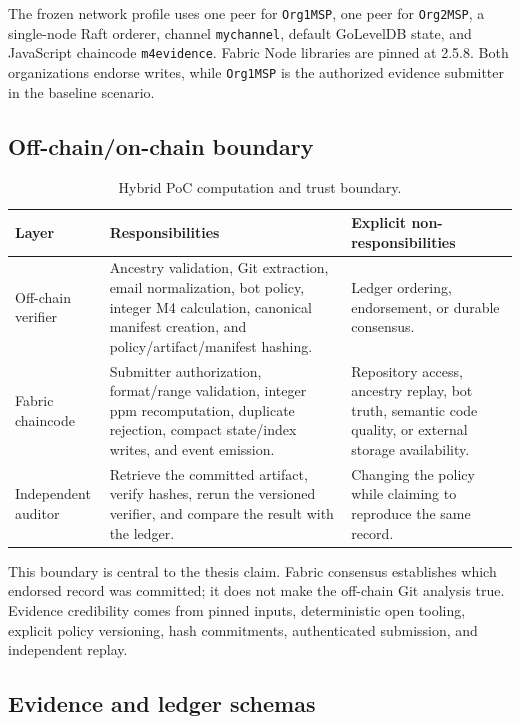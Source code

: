 The frozen network profile uses one peer for \texttt{Org1MSP}, one peer for \texttt{Org2MSP}, a single-node Raft orderer,
channel \texttt{mychannel}, default GoLevelDB state, and JavaScript chaincode \texttt{m4evidence}. Fabric Node libraries are
pinned at 2.5.8. Both organizations endorse writes, while \texttt{Org1MSP} is the authorized evidence submitter in the
baseline scenario.

\subsection{Off-chain/on-chain boundary}
\label{sec:phase3_hybrid_boundary}

\begin{table}[H]
\centering
\small
\renewcommand{\arraystretch}{1.1}
\begin{tabularx}{\textwidth}{p{2.7cm}X X}
\toprule
\textbf{Layer} & \textbf{Responsibilities} & \textbf{Explicit non-responsibilities} \\
\midrule
Off-chain verifier &
Ancestry validation, Git extraction, email normalization, bot policy, integer M4 calculation, canonical manifest creation,
and policy/artifact/manifest hashing. &
Ledger ordering, endorsement, or durable consensus. \\
Fabric chaincode &
Submitter authorization, format/range validation, integer ppm recomputation, duplicate rejection, compact state/index writes,
and event emission. &
Repository access, ancestry replay, bot truth, semantic code quality, or external storage availability. \\
Independent auditor &
Retrieve the committed artifact, verify hashes, rerun the versioned verifier, and compare the result with the ledger. &
Changing the policy while claiming to reproduce the same record. \\
\bottomrule
\end{tabularx}
\caption{Hybrid PoC computation and trust boundary.}
\label{tab:phase3_hybrid_boundary}
\end{table}

This boundary is central to the thesis claim. Fabric consensus establishes which endorsed record was committed; it does not
make the off-chain Git analysis true. Evidence credibility comes from pinned inputs, deterministic open tooling, explicit
policy versioning, hash commitments, authenticated submission, and independent replay.

\subsection{Evidence and ledger schemas}
\label{sec:phase3_schemas}


